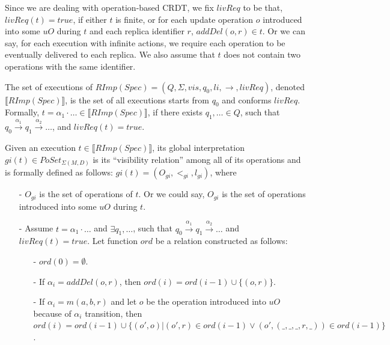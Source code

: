 {\begin{itemize}
    Since we are dealing with operation-based CRDT, we fix $livReq$ to be that, $livReq(t) = \mathit{true}$, if either $t$ is finite, {\color {red}or for each update operation $o$ introduced into some $uO$ during $t$ and each replica identifier $r$, $addDel(o,r) \in t$.} Or we can say, for each execution with infinite actions, we require each operation to be eventually delivered to each replica. We also assume that $t$ does not contain two operations with the same identifier.
\end{itemize}

The set of executions of $RImp(Spec) = (Q,\Sigma,vis,q_0,li,\rightarrow,livReq)$, denoted $\llbracket RImp(Spec) \rrbracket$, is the set of all executions starts from $q_0$ and conforms $livReq$. Formally, $t = \alpha_1 \cdot \ldots \in \llbracket RImp(Spec) \rrbracket$, if there exists $q_1,\ldots \in Q$, such that $q_0 {\xrightarrow{\alpha_1}} q_1 {\xrightarrow{\alpha_2}} \ldots$, and $livReq(t) = \mathit{true}$.

Given an execution $t \in \llbracket RImp(Spec) \rrbracket$, its global interpretation $gi(t) \in PoSet_{\Sigma(M,D)}$ is its ``visibility relation'' among all of its operations and is formally defined as follows: $gi(t) = (O_{gi},<_{gi},l_{gi})$, where

\begin{itemize}
\setlength{\itemsep}{0.5pt}
\item[-] $O_{gi}$ is the set of operations of $t$. Or we could say, $O_{gi}$ is the set of operations introduced into some $uO$ during $t$.

\item[-] Assume $t = \alpha_1 \cdot \ldots$ and $\exists q_1,\ldots$, such that $q_0 {\xrightarrow{\alpha_1}} q_1 {\xrightarrow{\alpha_2}} \ldots$ and $livReq(t) = \mathit{true}$. Let function $ord$ be a relation constructed as follows:

    \begin{itemize}
    \setlength{\itemsep}{0.5pt}
    \item[-] $ord(0) = \emptyset$.

    \item[-] If $\alpha_i = addDel(o,r)$, then $ord(i) = ord(i-1) \cup \{ (o,r) \}$.

    \item[-] If $\alpha_i = m(a,b,r)$ and let $o$ be the operation introduced into $uO$ because of $\alpha_i$ transition, then $ord(i) = ord(i-1) \cup \{ (o',o) \vert (o',r) \in ord(i-1) \vee (o',(\_,\_,\_,r,\_)) \in ord(i-1) \}$.
    \end{itemize}


\end{itemize}}
